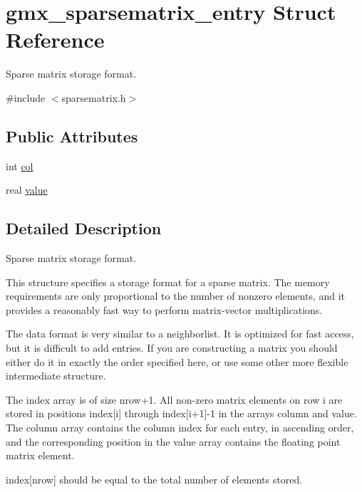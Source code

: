 \hypertarget{structgmx__sparsematrix__entry}{\section{gmx\-\_\-sparsematrix\-\_\-entry \-Struct \-Reference}
\label{structgmx__sparsematrix__entry}
}


\-Sparse matrix storage format.  




{\ttfamily \#include $<$sparsematrix.\-h$>$}

\subsection*{\-Public \-Attributes}
\begin{DoxyCompactItemize}
\item 
int \hyperlink{structgmx__sparsematrix__entry_a99e6c89426f4795cf6e91d089eb5a457}{col}
\item 
real \hyperlink{structgmx__sparsematrix__entry_aa635a46c3f16f7e276c640f28136cdd2}{value}
\end{DoxyCompactItemize}


\subsection{\-Detailed \-Description}
\-Sparse matrix storage format. 

\-This structure specifies a storage format for a sparse matrix. \-The memory requirements are only proportional to the number of nonzero elements, and it provides a reasonably fast way to perform matrix-\/vector multiplications.

\-The data format is very similar to a neighborlist. \-It is optimized for fast access, but it is difficult to add entries. \-If you are constructing a matrix you should either do it in exactly the order specified here, or use some other more flexible intermediate structure.

\-The index array is of size nrow+1. \-All non-\/zero matrix elements on row i are stored in positions index\mbox{[}i\mbox{]} through index\mbox{[}i+1\mbox{]}-\/1 in the arrays column and value. \-The column array contains the column index for each entry, in ascending order, and the corresponding position in the value array contains the floating point matrix element.

index\mbox{[}nrow\mbox{]} should be equal to the total number of elements stored.


